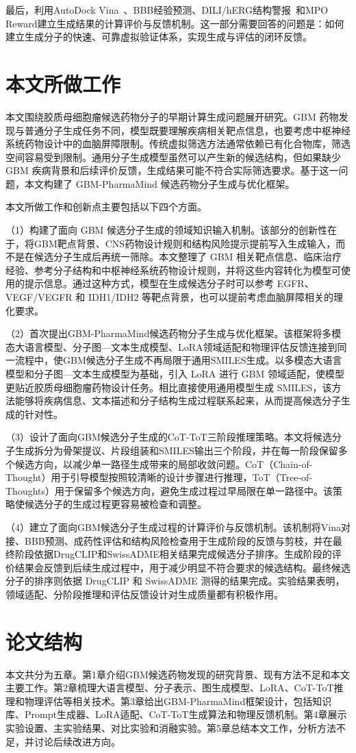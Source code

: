 最后，利用AutoDock Vina~\cite{Trott2010}、BBB经验预测、DILI/hERG结构警报~\cite{Aronov2008}和MPO Reward建立生成结果的计算评价与反馈机制。这一部分需要回答的问题是：如何建立生成分子的快速、可靠虚拟验证体系，实现生成与评估的闭环反馈。


\section{本文所做工作}\label{sec:research-work}

本文围绕胶质母细胞瘤候选药物分子的早期计算生成问题展开研究。GBM 药物发现与普通分子生成任务不同，模型既要理解疾病相关靶点信息，也要考虑中枢神经系统药物设计中的血脑屏障限制。传统虚拟筛选方法通常依赖已有化合物库，筛选空间容易受到限制。通用分子生成模型虽然可以产生新的候选结构，但如果缺少 GBM 疾病背景和后续评价反馈，生成结果可能不符合实际筛选要求。基于这一问题，本文构建了 GBM-PharmaMind 候选药物分子生成与优化框架。

本文所做工作和创新点主要包括以下四个方面。

（1）构建了面向 GBM 候选分子生成的领域知识输入机制。该部分的创新性在于，将GBM靶点背景、CNS药物设计规则和结构风险提示提前写入生成输入，而不是在候选分子生成后再统一筛除。本文整理了 GBM 相关靶点信息、临床治疗经验、参考分子结构和中枢神经系统药物设计规则，并将这些内容转化为模型可使用的提示信息。通过这种方式，模型在生成候选分子时可以参考 EGFR、VEGF/VEGFR 和 IDH1/IDH2 等靶点背景，也可以提前考虑血脑屏障相关的理化要求。

（2）首次提出GBM-PharmaMind候选药物分子生成与优化框架。该框架将多模态大语言模型、分子图—文本生成模型、LoRA领域适配和物理评估反馈连接到同一流程中，使GBM候选分子生成不再局限于通用SMILES生成。以多模态大语言模型和分子图—文本生成模型为基础，引入 LoRA 进行 GBM 领域适配，使模型更贴近胶质母细胞瘤药物设计任务。相比直接使用通用模型生成 SMILES，该方法能够将疾病信息、文本描述和分子结构生成过程联系起来，从而提高候选分子生成的针对性。

（3）设计了面向GBM候选分子生成的CoT-ToT三阶段推理策略。本文将候选分子生成拆分为骨架提议、片段组装和SMILES输出三个阶段，并在每一阶段保留多个候选方向，以减少单一路径生成带来的局部收敛问题。CoT（Chain-of-Thought）用于引导模型按照较清晰的设计步骤进行推理，ToT（Tree-of-Thoughts）用于保留多个候选方向，避免生成过程过早局限在单一路径中。该策略使候选分子的生成过程更容易被检查和调整。

（4）建立了面向GBM候选分子生成过程的计算评价与反馈机制。该机制将Vina对接、BBB预测、成药性评估和结构风险检查用于生成阶段的反馈与剪枝，并在最终阶段依据DrugCLIP和SwissADME相关结果完成候选分子排序。生成阶段的评价结果会反馈到后续生成过程中，用于减少明显不符合要求的候选结构。最终候选分子的排序则依据 DrugCLIP 和 SwissADME 测得的结果完成。实验结果表明，领域适配、分阶段推理和评估反馈设计对生成质量都有积极作用。


\section{论文结构}\label{sec:structure}

本文共分为五章。第1章介绍GBM候选药物发现的研究背景、现有方法不足和本文主要工作。第2章梳理大语言模型、分子表示、图生成模型、LoRA、CoT-ToT推理和物理评估等相关技术。第3章给出GBM-PharmaMind框架设计，包括知识库、Prompt生成器、LoRA适配、CoT-ToT生成算法和物理反馈机制。第4章展示实验设置、主实验结果、对比实验和消融实验。第5章总结本文工作，分析方法不足，并讨论后续改进方向。
